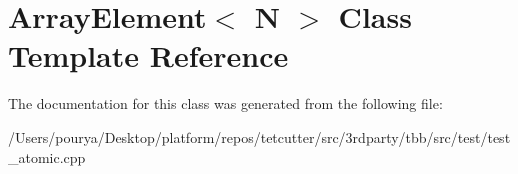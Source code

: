 \hypertarget{classArrayElement}{}\section{Array\+Element$<$ N $>$ Class Template Reference}
\label{classArrayElement}


The documentation for this class was generated from the following file\+:\begin{DoxyCompactItemize}
\item 
/\+Users/pourya/\+Desktop/platform/repos/tetcutter/src/3rdparty/tbb/src/test/test\+\_\+atomic.\+cpp\end{DoxyCompactItemize}
